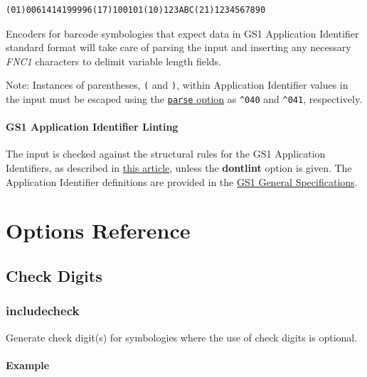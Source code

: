 \begin{verbatim}
(01)0061414199996(17)100101(10)123ABC(21)1234567890
\end{verbatim}

Encoders for barcode symbologies that expect data in GS1 Application
Identifier standard format will take care of parsing the input and
inserting any necessary \emph{FNC1} characters to delimit variable
length fields.

Note: Instances of parentheses, \texttt{(} and \texttt{)}, within
Application Identifier values in the input must be escaped using the
\protect\hyperlink{input-processingux5cux23parse}{\texttt{parse} option}
as \texttt{\^{}040} and \texttt{\^{}041}, respectively.

\hypertarget{gs1-application-identifier-linting}{%
\paragraph{GS1 Application Identifier
Linting}\label{gs1-application-identifier-linting}}

The input is checked against the structural rules for the GS1
Application Identifiers, as described in
\href{https://www.linkedin.com/pulse/gs1-application-identifier-syntax-dictionary-terry-burton/}{this
article}, unless the \textbf{dontlint} option is given. The Application
Identifier definitions are provided in the
\href{http://www.gs1.org/barcodes-epcrfid-id-keys/gs1-general-specifications}{GS1
General Specifications}.

\hypertarget{options-reference}{%
\section{Options Reference}\label{options-reference}}

\hypertarget{check-digits}{%
\subsection{Check Digits}\label{check-digits}}

\hypertarget{includecheck}{%
\subsubsection{includecheck}\label{includecheck}}

Generate check digit(s) for symbologies where the use of check digits is
optional.

\hypertarget{example-25}{%
\paragraph{Example}\label{example-25}}

